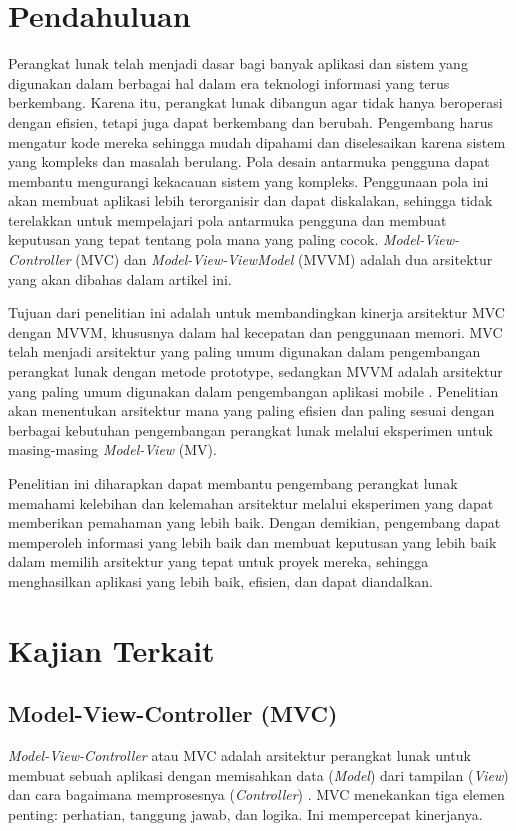 \documentclass[conference]{IEEEtran}
\begin{document}
	\section{Pendahuluan}
	Perangkat lunak telah menjadi dasar bagi banyak aplikasi dan sistem yang digunakan dalam berbagai hal dalam era teknologi informasi yang terus berkembang. Karena itu, perangkat lunak dibangun agar tidak hanya beroperasi dengan efisien, tetapi juga dapat berkembang dan berubah. Pengembang harus mengatur kode mereka sehingga mudah dipahami dan diselesaikan karena sistem yang kompleks dan masalah berulang. Pola desain antarmuka pengguna dapat membantu mengurangi kekacauan sistem yang kompleks. Penggunaan pola ini akan membuat aplikasi lebih terorganisir dan dapat diskalakan, sehingga tidak terelakkan untuk mempelajari pola antarmuka pengguna dan membuat keputusan yang tepat tentang pola mana yang paling cocok\cite{Perbandingan4}. \textit{Model-View-Controller} (MVC) dan \textit{Model-View-ViewModel} (MVVM) adalah dua arsitektur yang akan dibahas dalam artikel ini.
	
	Tujuan dari penelitian ini adalah untuk membandingkan kinerja arsitektur MVC dengan MVVM, khususnya dalam hal kecepatan dan penggunaan memori. MVC telah menjadi arsitektur yang paling umum digunakan dalam pengembangan perangkat lunak dengan metode prototype, sedangkan MVVM adalah arsitektur yang paling umum digunakan dalam pengembangan aplikasi mobile \cite{Perbandingan4}. Penelitian akan menentukan arsitektur mana yang paling efisien dan paling sesuai dengan berbagai kebutuhan pengembangan perangkat lunak melalui eksperimen untuk masing-masing \textit{Model-View} (MV). 
	
	Penelitian ini diharapkan dapat membantu pengembang perangkat lunak memahami kelebihan dan kelemahan arsitektur melalui eksperimen yang dapat memberikan pemahaman yang lebih baik. Dengan demikian, pengembang dapat memperoleh informasi yang lebih baik dan membuat keputusan yang lebih baik dalam memilih arsitektur yang tepat untuk proyek mereka, sehingga menghasilkan aplikasi yang lebih baik, efisien, dan dapat diandalkan.
	
	
	\section{Kajian Terkait}
	
	\subsection{Model-View-Controller (MVC)}
	\textit{Model-View-Controller} atau MVC adalah arsitektur perangkat lunak untuk membuat sebuah aplikasi dengan memisahkan data (\textit{Model}) dari tampilan (\textit{View}) dan cara bagaimana memprosesnya (\textit{Controller})\cite{Perbandingan4} \cite{MVC} . MVC menekankan tiga elemen penting: perhatian, tanggung jawab, dan logika. Ini mempercepat kinerjanya.
	
\end{document}
